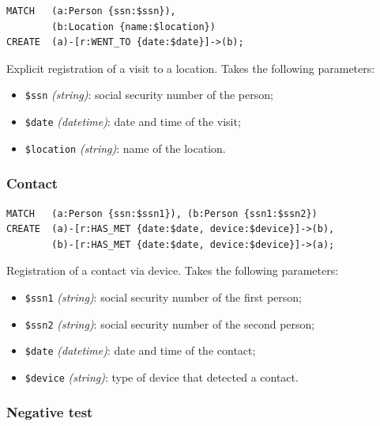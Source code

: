 \documentclass[12pt, a4paper]{article}
\begin{document}
\begin{tcolorbox}[fontupper=\scriptsize]
    \begin{verbatim}
MATCH   (a:Person {ssn:$ssn}),
        (b:Location {name:$location})
CREATE  (a)-[r:WENT_TO {date:$date}]->(b);  
    \end{verbatim}
\end{tcolorbox}

\noindent %
Explicit registration of a visit to a location.
Takes the following parameters: 
\begin{itemize}
    \item \texttt{\$ssn} \emph{(string)}: social security number of the person;
    \item \texttt{\$date} \emph{(datetime)}: date and time of the visit;
    \item \texttt{\$location} \emph{(string)}: name of the location.
\end{itemize}

\subsubsection{Contact}

\begin{tcolorbox}[fontupper=\scriptsize]
    \begin{verbatim}
MATCH   (a:Person {ssn:$ssn1}), (b:Person {ssn1:$ssn2})
CREATE  (a)-[r:HAS_MET {date:$date, device:$device}]->(b), 
        (b)-[r:HAS_MET {date:$date, device:$device}]->(a);
    \end{verbatim}
\end{tcolorbox}

\noindent %
Registration of a contact via device.
Takes the following parameters: 
\begin{itemize}
    \item \texttt{\$ssn1} \emph{(string)}: social security number of the 
        first person;
    \item \texttt{\$ssn2} \emph{(string)}: social security number of the
        second person;
    \item \texttt{\$date} \emph{(datetime)}: date and time of the contact;
    \item \texttt{\$device} \emph{(string)}: type of device that detected a 
        contact.
\end{itemize}

\subsubsection{Negative test}
\end{document}
